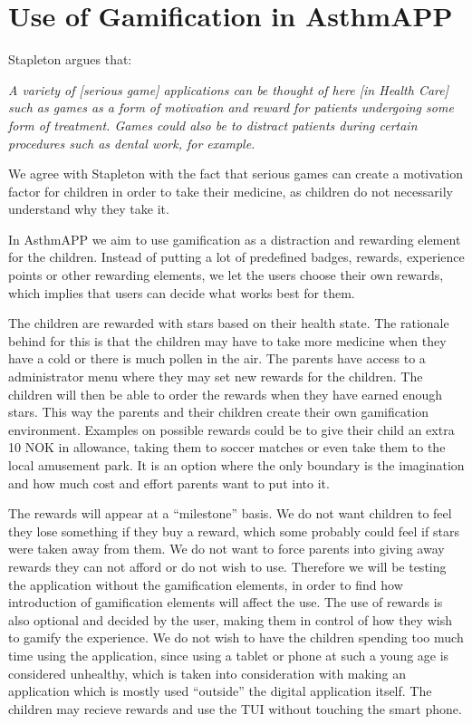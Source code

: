 \section{Use of Gamification in AsthmAPP}
\label{gamificationinapp}

Stapleton argues that:

\textit{A variety of [serious game] applications can be thought of here [in Health Care] such as games as a form of motivation and reward for patients undergoing some form of treatment. Games could also be to distract patients during certain procedures such as dental work, for example.}\cite{stapleton2004serious}


We agree with Stapleton with the fact that serious games can create a motivation factor for children in order to take their medicine, as children do not necessarily understand why they take it. 


In AsthmAPP we aim to use gamification as a distraction and rewarding element for the children. Instead of putting a lot of predefined badges, rewards, experience points or other rewarding elements, we let the users choose their own rewards, which implies that users can decide what works best for them.  
 

The children are rewarded with stars based on their health state. The rationale behind for this is that the children may have to take more medicine when they have a cold or there is much pollen in the air. The parents have access to a administrator menu where they may set new rewards for the children. The children will then be able to order the rewards when they have earned enough stars. This way the parents and their children create their own gamification environment. Examples on possible rewards could be to give their child an extra 10 NOK in allowance, taking them to soccer matches or even take them to the local amusement park. It is an option where the only boundary is the imagination and how much cost and effort parents want to put into it.    


The rewards will appear at a ``milestone'' basis. We do not want children to feel they lose something if they buy a reward, which some probably could feel if stars were taken away from them. We do not want to force parents into giving away rewards they can not afford or do not wish to use. Therefore we will be testing the application without the gamification elements, in order to find how introduction of gamification elements will affect the use. The use of rewards is also optional and decided by the user, making them in control of how they wish to gamify the experience. 
We do not wish to have the children spending too much time using the application, since using a tablet or phone at such a young age is considered unhealthy, which is taken into consideration with making an application which is mostly used ``outside'' the digital application itself. The children may recieve rewards and use the TUI without touching the smart phone.

